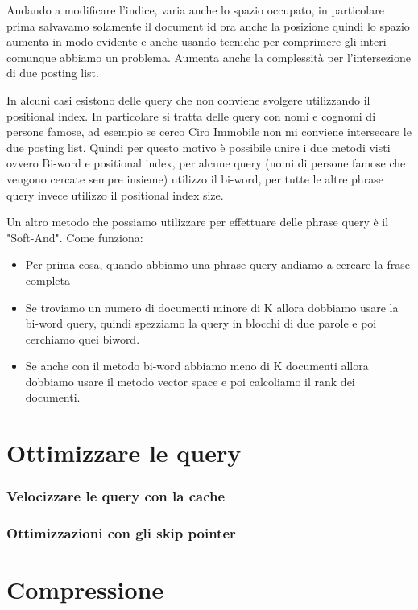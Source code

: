 \documentclass[14pt]{extreport}
\begin{document}
Andando a modificare l'indice, varia anche lo spazio occupato, in particolare prima salvavamo solamente il document id ora anche la posizione quindi lo spazio aumenta in modo evidente e anche usando tecniche per comprimere gli interi comunque abbiamo un problema.
Aumenta anche la complessità per l'intersezione di due posting list.

In alcuni casi esistono delle query che non conviene svolgere utilizzando il positional index. In particolare si tratta delle query con nomi e cognomi di persone famose, ad esempio se cerco Ciro Immobile non mi conviene intersecare le due posting list.
Quindi per questo motivo è possibile unire i due metodi visti ovvero Bi-word e positional index, per alcune query (nomi di persone famose che vengono cercate sempre insieme) utilizzo il bi-word, per tutte le altre phrase query invece utilizzo il positional index size.

Un altro metodo che possiamo utilizzare per effettuare delle phrase query è il "Soft-And".
Come funziona:
\begin{itemize}
    \item Per prima cosa, quando abbiamo una phrase query andiamo a cercare la frase completa
    \item Se troviamo un numero di documenti minore di K allora dobbiamo usare la bi-word query, quindi spezziamo la query in blocchi di due parole e poi cerchiamo quei biword.
    \item Se anche con il metodo bi-word abbiamo meno di K documenti allora dobbiamo usare il metodo vector space e poi calcoliamo il rank dei documenti.
\end{itemize}

\chapter{Ottimizzare le query}

\subsection{Velocizzare le query con la cache}

\subsection{Ottimizzazioni con gli skip pointer}

\chapter{Compressione}
\end{document}
